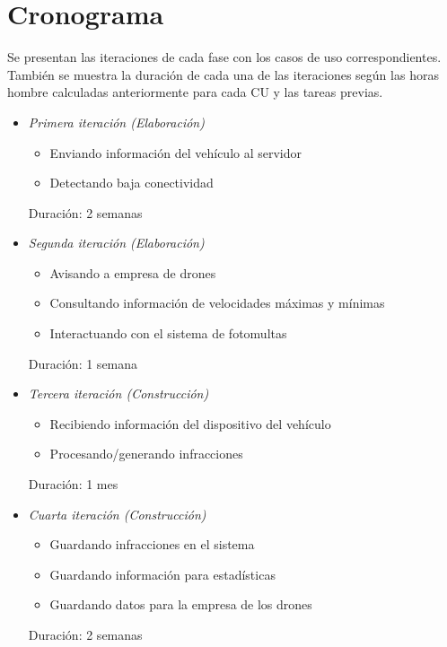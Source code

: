 \section{Cronograma}

Se presentan las iteraciones de cada fase con los casos de uso correspondientes. 
También se muestra la duración de cada una de las iteraciones según las
horas hombre calculadas anteriormente para cada CU y las tareas previas.

\begin{itemize}

\item \textit{Primera iteración (Elaboración)}
\begin{itemize}
\item Enviando información del vehículo al servidor
\item Detectando baja conectividad
\end{itemize}

Duración: 2 semanas

\item \textit{Segunda iteración (Elaboración)}
\begin{itemize}
\item Avisando a empresa de drones
\item Consultando información de velocidades máximas y mínimas
\item Interactuando con el sistema de fotomultas
\end{itemize}

Duración: 1 semana

\item \textit{Tercera iteración (Construcción)}
\begin{itemize}
\item Recibiendo información del dispositivo del vehículo
\item Procesando/generando infracciones
\end{itemize}

Duración: 1 mes

\item \textit{Cuarta iteración (Construcción)}
\begin{itemize}
\item Guardando infracciones en el sistema 
\item Guardando información para estadísticas 
\item Guardando datos para la empresa de los drones 
\end{itemize}

Duración: 2 semanas


\end{itemize}
